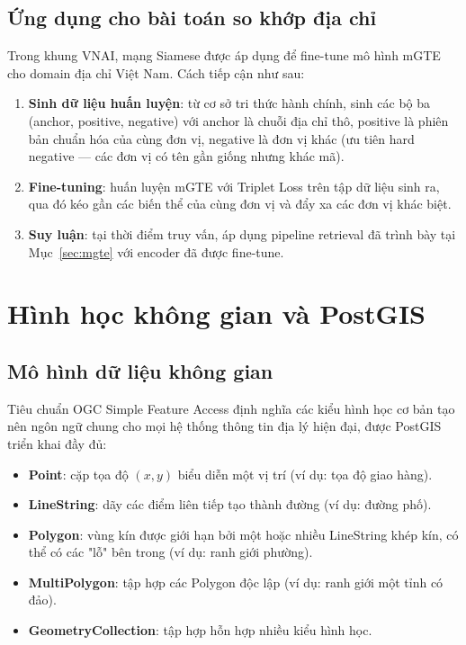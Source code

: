 \subsection{Ứng dụng cho bài toán so khớp địa chỉ}

Trong khung VNAI, mạng Siamese được áp dụng để fine-tune mô hình mGTE cho domain địa chỉ Việt Nam. Cách tiếp cận như sau:
\begin{enumerate}[leftmargin=*]
\item \textbf{Sinh dữ liệu huấn luyện}: từ cơ sở tri thức hành chính, sinh các bộ ba (anchor, positive, negative) với anchor là chuỗi địa chỉ thô, positive là phiên bản chuẩn hóa của cùng đơn vị, negative là đơn vị khác (ưu tiên hard negative --- các đơn vị có tên gần giống nhưng khác mã).
\item \textbf{Fine-tuning}: huấn luyện mGTE với Triplet Loss trên tập dữ liệu sinh ra, qua đó kéo gần các biến thể của cùng đơn vị và đẩy xa các đơn vị khác biệt.
\item \textbf{Suy luận}: tại thời điểm truy vấn, áp dụng pipeline retrieval đã trình bày tại Mục~\ref{sec:mgte} với encoder đã được fine-tune.
\end{enumerate}

\section{Hình học không gian và PostGIS}
\label{sec:postgis}

\subsection{Mô hình dữ liệu không gian}

Tiêu chuẩn OGC Simple Feature Access \cite{OGC2011SFA} định nghĩa các kiểu hình học cơ bản tạo nên ngôn ngữ chung cho mọi hệ thống thông tin địa lý hiện đại, được PostGIS triển khai đầy đủ:
\begin{itemize}[leftmargin=*]
\item \textbf{Point}: cặp tọa độ $(x, y)$ biểu diễn một vị trí (ví dụ: tọa độ giao hàng).
\item \textbf{LineString}: dãy các điểm liên tiếp tạo thành đường (ví dụ: đường phố).
\item \textbf{Polygon}: vùng kín được giới hạn bởi một hoặc nhiều LineString khép kín, có thể có các "lỗ" bên trong (ví dụ: ranh giới phường).
\item \textbf{MultiPolygon}: tập hợp các Polygon độc lập (ví dụ: ranh giới một tỉnh có đảo).
\item \textbf{GeometryCollection}: tập hợp hỗn hợp nhiều kiểu hình học.
\end{itemize}

